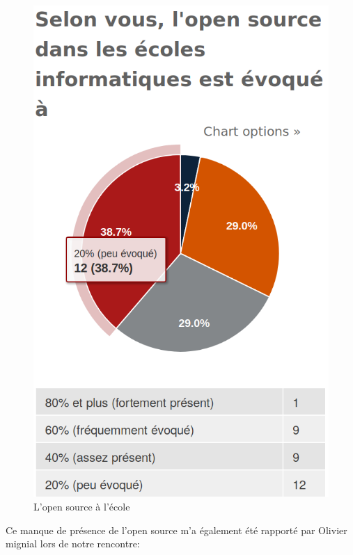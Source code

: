 				\begin{figure}[!htb]
					\center
					\includegraphics[scale=0.28]{./img/a5}
					\caption{L'open source à l'école}					
				\end{figure}

				Ce manque de présence de l'open source m'a également été rapporté par Olivier mignial lors de notre rencontre:

				\begin{center}
					\textit{
					}
				\end{center}

